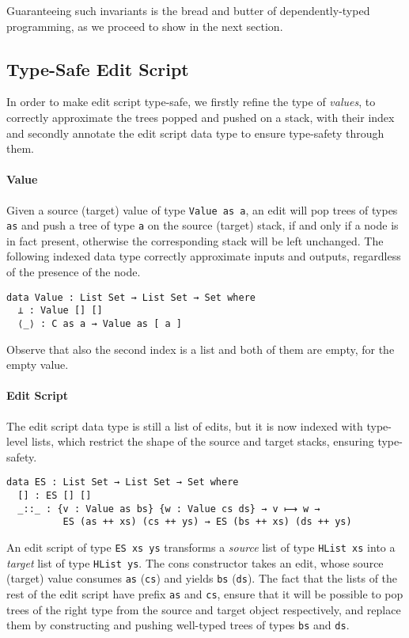 \documentclass{sigplanconf}
\theoremstyle{plain}
\begin{document}
%
Guaranteeing such invariants is the bread and butter of
dependently-typed programming, as we proceed to show in the next
section.

\subsection{Type-Safe Edit Script}
In order to make edit script type-safe, we firstly refine the type of
\emph{values}, to correctly approximate the trees popped and pushed on
a stack, with their index and secondly annotate the edit script data
type to ensure type-safety through them.

\paragraph{Value}
Given a source (target) value of type \texttt{Value as a}, an edit
will pop trees of types \texttt{as} and push a tree of type \texttt{a}
on the source (target) stack, if and only if a node is in fact
present, otherwise the corresponding stack will be left unchanged.
%
The following indexed data type correctly approximate inputs and
outputs, regardless of the presence of the node.
\begin{verbatim}
data Value : List Set → List Set → Set where
  ⊥ : Value [] []
  ⟨_⟩ : C as a → Value as [ a ] 
\end{verbatim}
Observe that also the second index is a list and both of them are
empty, for the empty value.
%

\paragraph{Edit Script}
The edit script data type is still a list of edits, but it is now
indexed with type-level lists, which restrict the shape of the source
and target stacks, ensuring type-safety.
%
\begin{verbatim}
data ES : List Set → List Set → Set where
  [] : ES [] []
  _::_ : {v : Value as bs} {w : Value cs ds} → v ⟼ w → 
          ES (as ++ xs) (cs ++ ys) → ES (bs ++ xs) (ds ++ ys)
\end{verbatim}	
An edit script of type \texttt{ES xs ys} transforms a \emph{source}
list of type \texttt{HList xs} into a \emph{target} list of type
\texttt{HList ys}.  
%
The cons constructor takes an edit, whose source (target) value
consumes \texttt{as} (\texttt{cs}) and yields \texttt{bs}
(\texttt{ds}).
%
The fact that the lists of the rest of the edit script have prefix
\texttt{as} and \texttt{cs}, ensure that it will be possible to pop
trees of the right type from the source and target object
respectively, and replace them by constructing and pushing well-typed
trees of types \texttt{bs} and \texttt{ds}.
\end{document}

